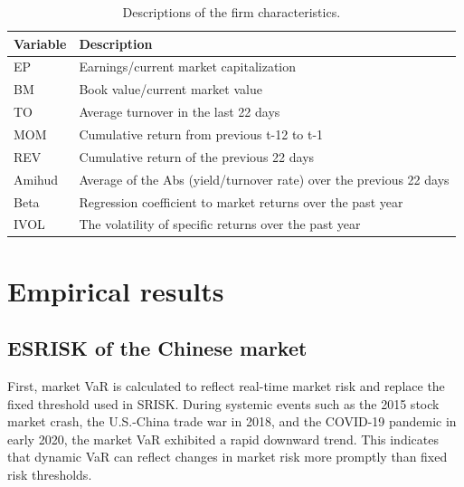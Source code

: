 \documentclass[12pt,a4paper]{article}
\begin{document}
    \begin{table}[H]
    \centering
    \caption{Descriptions of the firm characteristics.}
    \begin{tabular}{ll}
    \toprule
    Variable & Description \\
    \midrule
    EP & Earnings/current market capitalization \\
    BM & Book value/current market value \\
    TO & Average turnover in the last 22 days \\
    MOM & Cumulative return from previous t-12 to t-1 \\
    REV & Cumulative return of the previous 22 days \\
    Amihud & Average of the Abs (yield/turnover rate) over the previous 22 days \\
    Beta & Regression coefficient to market returns over the past year \\
    IVOL & The volatility of specific returns over the past year \\
    \bottomrule
    \end{tabular}
    \end{table}

    \section{Empirical results}

    \subsection{ESRISK of the Chinese market}

    First, market VaR is calculated to reflect real-time market risk and replace the fixed threshold used in SRISK. During systemic events such as the 2015 stock market crash, the U.S.-China trade war in 2018, and the COVID-19 pandemic in early 2020, the market VaR exhibited a rapid downward trend. This indicates that dynamic VaR can reflect changes in market risk more promptly than fixed risk thresholds.
\end{document}
